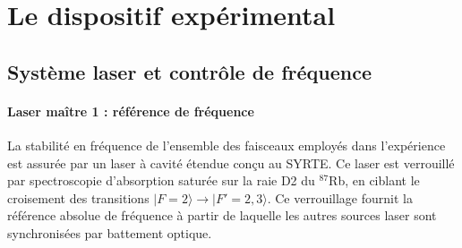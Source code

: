 \section{Le dispositif expérimental}
\subsection{Système laser et contrôle de fréquence}
\label{sec:systeme_laser}


\paragraph{Laser maître 1 : référence de fréquence}
La stabilité en fréquence de l’ensemble des faisceaux employés dans l’expérience est assurée par un laser à cavité étendue conçu au SYRTE. Ce laser est verrouillé par spectroscopie d’absorption saturée sur la raie D2 du $^{87}$Rb, en ciblant le croisement des transitions $|F=2\rangle \rightarrow |F'=2,3\rangle$. Ce verrouillage fournit la référence absolue de fréquence à partir de laquelle les autres sources laser sont synchronisées par battement optique.

%

